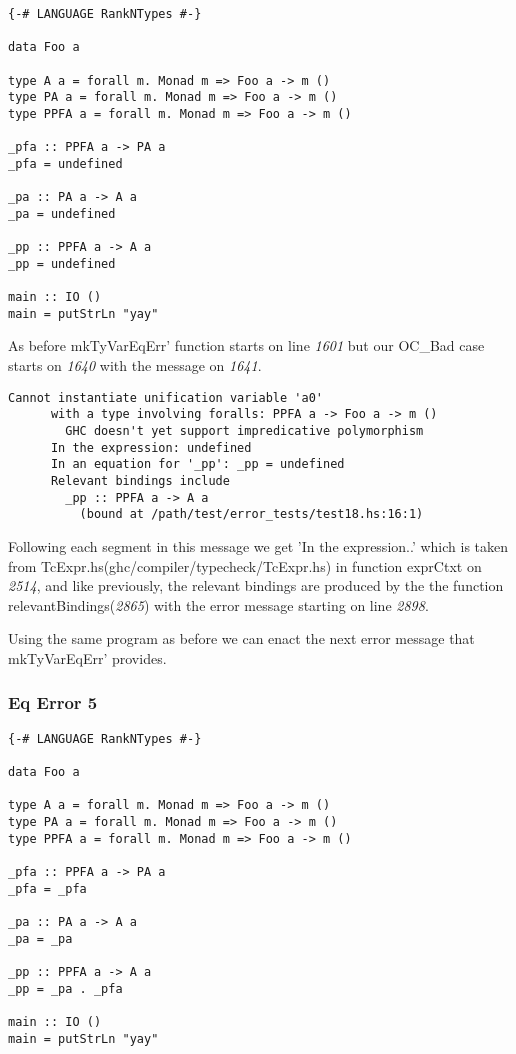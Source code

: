 \documentclass[a4paper]{article}
\begin{document}
\begin{lstlisting}[label={lst: T10.0}, numbers=none, caption={Example Program \cite{ex10}}]
{-# LANGUAGE RankNTypes #-}

data Foo a

type A a = forall m. Monad m => Foo a -> m ()
type PA a = forall m. Monad m => Foo a -> m ()
type PPFA a = forall m. Monad m => Foo a -> m ()

_pfa :: PPFA a -> PA a
_pfa = undefined

_pa :: PA a -> A a
_pa = undefined

_pp :: PPFA a -> A a
_pp = undefined

main :: IO ()
main = putStrLn "yay"
\end{lstlisting}

As before mkTyVarEqErr' function starts on line \textit{1601} but our OC\_Bad case starts on \textit{1640} with the message on \textit{1641}.

\begin{lstlisting}[label={lst: T10.0.2}, numbers=none, caption={Error}]
Cannot instantiate unification variable 'a0'
      with a type involving foralls: PPFA a -> Foo a -> m ()
        GHC doesn't yet support impredicative polymorphism
      In the expression: undefined
      In an equation for '_pp': _pp = undefined
      Relevant bindings include
        _pp :: PPFA a -> A a
          (bound at /path/test/error_tests/test18.hs:16:1)
\end{lstlisting}

Following each segment in this message we get 'In the expression..' which is taken from TcExpr.hs(ghc/compiler/typecheck/TcExpr.hs) in function exprCtxt on \textit{2514}, and like previously, the relevant bindings are produced by the the function relevantBindings(\textit{2865}) with the error message starting on line \textit{2898}.

Using the same program as before we can enact the next error message that mkTyVarEqErr' provides.

\subsubsection{Eq Error 5}

\begin{lstlisting}[label={lst: T11.0}, numbers=none, caption={Example Program \cite{ex10}}]
{-# LANGUAGE RankNTypes #-}

data Foo a

type A a = forall m. Monad m => Foo a -> m ()
type PA a = forall m. Monad m => Foo a -> m ()
type PPFA a = forall m. Monad m => Foo a -> m ()

_pfa :: PPFA a -> PA a
_pfa = _pfa

_pa :: PA a -> A a
_pa = _pa

_pp :: PPFA a -> A a
_pp = _pa . _pfa

main :: IO ()
main = putStrLn "yay"
\end{lstlisting}
\end{document}

